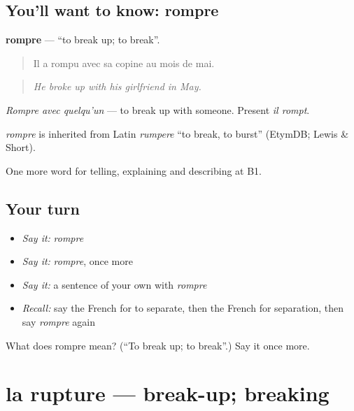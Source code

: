 \subsection*{You'll want to know: rompre}
\textbf{rompre} — \textquotedblleft{}to break up; to break\textquotedblright{}.

\begin{quote}
Il a rompu avec sa copine au mois de mai.
\end{quote}

\begin{quote}
\emph{He broke up with his girlfriend in May.}
\end{quote}

\emph{Rompre avec quelqu'un} — to break up with someone. Present \emph{il rompt}.

\begin{cousinweb}
\emph{rompre} is inherited from Latin \emph{rumpere} \textquotedblleft{}to break, to burst\textquotedblright{} (EtymDB; Lewis \& Short).
\end{cousinweb}

\begin{grammarlens}[title={What you've built}]
One more word for telling, explaining and describing at B1.
\end{grammarlens}

\subsection*{Your turn}
\begin{itemize}
\raggedright
  \item \emph{Say it:} \emph{rompre}
  \item \emph{Say it:} \emph{rompre}, once more
  \item \emph{Say it:} a sentence of your own with \emph{rompre}
  \item \emph{Recall:} say the French for to separate, then the French for separation, then say \emph{rompre} again
\end{itemize}

\begin{tcolorbox}[breakable,colback=teal!4,colframe=teal!35!black,title={Before you move on}]
What does rompre mean? (\textquotedblleft{}To break up; to break\textquotedblright{}.) Say it once more.
\end{tcolorbox}
\section[la rupture]{la rupture — break-up; breaking}

